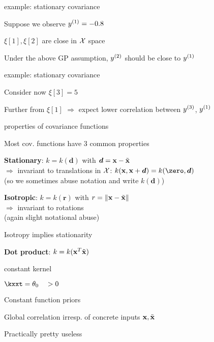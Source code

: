 \documentclass[11pt,compress,t,notes=noshow, xcolor=table]{beamer}
\begin{document}
\begin{framei}{example: stationary covariance}
\item Suppose we observe $\yi[1] = -0.8$
\item $\xi[1], \xi[2]$ are close in $\Xspace$ space
\item Under the above GP assumption, $\yi[2]$ should be close to $\yi[1]$ 
\vfill
{}
\end{framei}

\begin{framei}{example: stationary covariance}
\item Consider now $\xi[3] = 5$
\item Further from $\xi[1]$ $\Rightarrow$ expect lower correlation between $\yi[3]$, $\yi[1]$ 
\vfill
{}
\end{framei}

\begin{framei}[sep=L]{properties of covariance functions}
\item Most cov. functions have 3 common properties
\item \textbf{Stationary}: $k = k(\bm{d})$ with $\bm{d} = \xv - \xtil$ \\
$\Rightarrow$ invariant to translations in $\Xspace$: $k(\xv, \xv + \bm{d}) = k(\zero, \bm{d})$\\
(so we sometimes abuse notation and write $k(\bm{d})$)
\item \textbf{Isotropic}: $k = k(\bm{r})$ with $r = \xxtnorm$ \\
$\Rightarrow$ invariant to rotations\\
(again slight notational abuse)
\item Isotropy implies stationarity
\item \textbf{Dot product}: $k = k(\xv^T \xtil)$
\end{framei}

\begin{framei}{constant kernel}
\item $\kxxt = \theta_0 \quad > 0$
\item Constant function priors
\item Global correlation irresp. of concrete inputs $\xv, \xtil$
\item Practically pretty useless
\vfill
{}
\end{framei}
\end{document}
